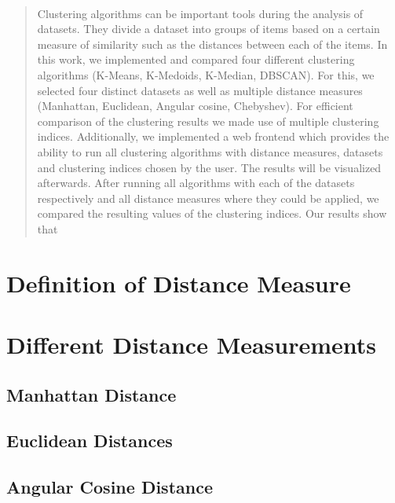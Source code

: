 \documentclass[12pt, english]
{article}
\begin{document}
\newpage\thispagestyle{empty}~ %
\newpage 

\begin{abstract}
Clustering algorithms can be important tools during the analysis of datasets. They divide a dataset into groups of items based on a certain measure of similarity such as the distances between each of the items. 
In this work, we implemented and compared four different clustering algorithms (K-Means, K-Medoids, K-Median, DBSCAN). For this, we selected four distinct datasets as well as multiple distance measures (Manhattan, Euclidean, Angular cosine, Chebyshev). For efficient comparison of the clustering results we made use of multiple clustering indices. Additionally, we implemented a web frontend which provides the ability to run all clustering algorithms with distance measures, datasets and clustering indices chosen by the user. The results will be visualized afterwards.
After running all algorithms with each of the datasets respectively and all distance measures where they could be applied, we compared the resulting values of the clustering indices.
Our results show that

\end{abstract}

\newpage

\tableofcontents

\newpage


\section{Definition of Distance Measure}
\label{def_DM}

\section{Different Distance Measurements} \label{distances}
\subsection{Manhattan Distance}

\subsection{Euclidean Distances}


\subsection{Angular Cosine Distance}

\end{document}
